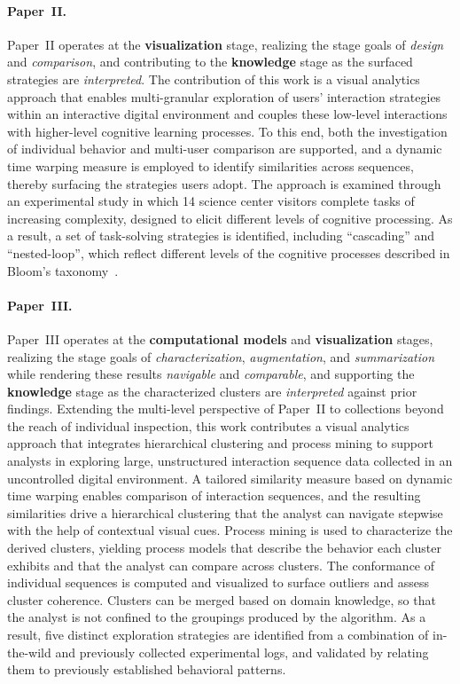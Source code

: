 \paragraph{Paper~II.}
Paper~II operates at the \textbf{visualization} stage, realizing the stage goals of \textit{design} and \textit{comparison}, and contributing to the \textbf{knowledge} stage as the surfaced strategies are \textit{interpreted}.
The contribution of this work is a visual analytics approach that enables multi-granular exploration of users' interaction strategies within an interactive digital environment and couples these low-level interactions with higher-level cognitive learning processes.
To this end, both the investigation of individual behavior and multi-user comparison are supported, and a dynamic time warping measure is employed to identify similarities across sequences, thereby surfacing the strategies users adopt.
The approach is examined through an experimental study in which 14 science center visitors complete tasks of increasing complexity, designed to elicit different levels of cognitive processing.
As a result, a set of task-solving strategies is identified, including ``cascading'' and ``nested-loop'', which reflect different levels of the cognitive processes described in Bloom's taxonomy~\cite{bloom1956taxonomy, anderson2001taxonomy}.


\paragraph{Paper~III.}
Paper~III operates at the \textbf{computational models} and \textbf{visualization} stages, realizing the stage goals of \textit{characterization}, \textit{augmentation}, and \textit{summarization} while rendering these results \textit{navigable} and \textit{comparable}, and supporting the \textbf{knowledge} stage as the characterized clusters are \textit{interpreted} against prior findings.
Extending the multi-level perspective of Paper~II to collections beyond the reach of individual inspection, this work contributes a visual analytics approach that integrates hierarchical clustering and process mining to support analysts in exploring large, unstructured interaction sequence data collected in an uncontrolled digital environment.
A tailored similarity measure based on dynamic time warping enables comparison of interaction sequences, and the resulting similarities drive a hierarchical clustering that the analyst can navigate stepwise with the help of contextual visual cues.
Process mining is used to characterize the derived clusters, yielding process models that describe the behavior each cluster exhibits and that the analyst can compare across clusters.
The conformance of individual sequences is computed and visualized to surface outliers and assess cluster coherence.
Clusters can be merged based on domain knowledge, so that the analyst is not confined to the groupings produced by the algorithm.
As a result, five distinct exploration strategies are identified from a combination of in-the-wild and previously collected experimental logs, and validated by relating them to previously established behavioral patterns.


